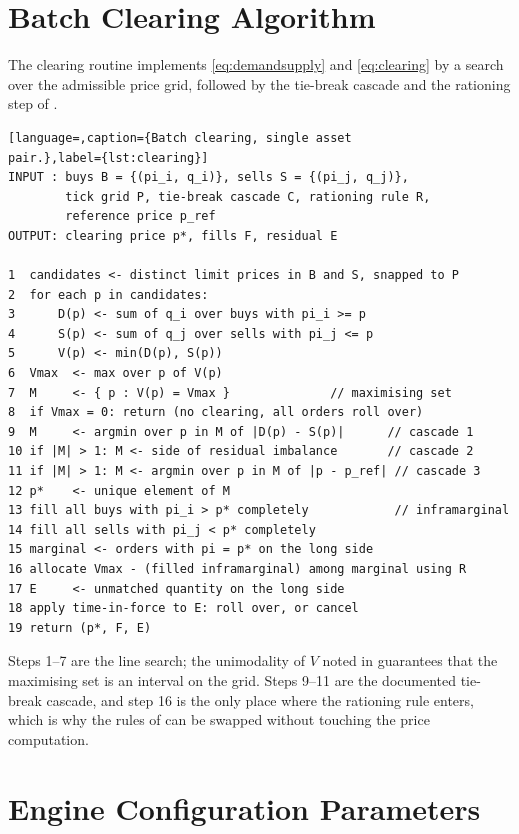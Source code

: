 \chapter{Batch Clearing Algorithm}
\label{app:algorithm}

The clearing routine implements \eqref{eq:demandsupply} and
\eqref{eq:clearing} by a search over the admissible price grid, followed
by the tie-break cascade and the rationing step of
.

\begin{lstlisting}[language=,caption={Batch clearing, single asset
pair.},label={lst:clearing}]
INPUT : buys B = {(pi_i, q_i)}, sells S = {(pi_j, q_j)},
        tick grid P, tie-break cascade C, rationing rule R,
        reference price p_ref
OUTPUT: clearing price p*, fills F, residual E

1  candidates <- distinct limit prices in B and S, snapped to P
2  for each p in candidates:
3      D(p) <- sum of q_i over buys with pi_i >= p
4      S(p) <- sum of q_j over sells with pi_j <= p
5      V(p) <- min(D(p), S(p))
6  Vmax  <- max over p of V(p)
7  M     <- { p : V(p) = Vmax }              // maximising set
8  if Vmax = 0: return (no clearing, all orders roll over)
9  M     <- argmin over p in M of |D(p) - S(p)|      // cascade 1
10 if |M| > 1: M <- side of residual imbalance       // cascade 2
11 if |M| > 1: M <- argmin over p in M of |p - p_ref| // cascade 3
12 p*    <- unique element of M
13 fill all buys with pi_i > p* completely            // inframarginal
14 fill all sells with pi_j < p* completely
15 marginal <- orders with pi = p* on the long side
16 allocate Vmax - (filled inframarginal) among marginal using R
17 E     <- unmatched quantity on the long side
18 apply time-in-force to E: roll over, or cancel
19 return (p*, F, E)
\end{lstlisting}

Steps 1--7 are the line search; the unimodality of $V$ noted in
 guarantees that the maximising set is an interval on
the grid. Steps 9--11 are the documented tie-break cascade, and step 16
is the only place where the rationing rule enters, which is why the
rules of  can be swapped without touching the price
computation.

\chapter{Engine Configuration Parameters}
\label{app:config}

